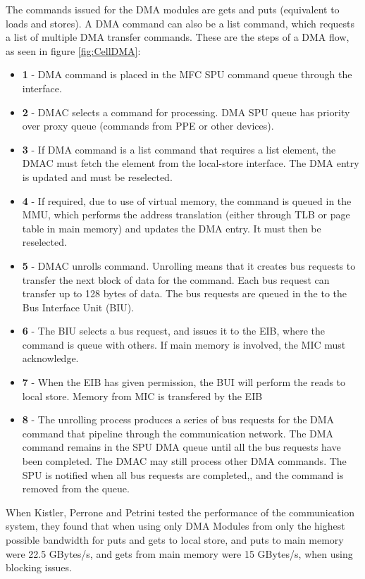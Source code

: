 The commands issued for the DMA modules are gets and puts (equivalent to loads and stores).
A DMA command can also be a list command, which requests a list of multiple DMA transfer commands.
These are the steps of a DMA flow, as seen in figure \ref{fig:CellDMA}:

\begin{itemize}
    \item \textbf{1} - DMA command is placed in the MFC SPU command queue through the interface.
    \item \textbf{2} - DMAC selects a command for processing. DMA SPU queue has priority over proxy queue (commands from PPE or other devices).
    \item \textbf{3} - If DMA command is a list command that requires a list element, the DMAC must fetch the element from the local-store interface. 
    The DMA entry is updated and must be reselected.
    \item \textbf{4} - If required, due to use of virtual memory, the command is queued in the MMU, which performs the address translation (either through TLB or page table in main memory) and updates the DMA entry. 
    It must then be reselected.
    \item \textbf{5} - DMAC unrolls command.
    Unrolling means that it creates bus requests to transfer the next block of data for the command.
    Each bus request can transfer up to 128 bytes of data.
    The bus requests are queued in the to the Bus Interface Unit (BIU).
    \item \textbf{6} - The BIU selects a bus request, and issues it to the EIB, where the command is queue with others.
    If main memory is involved, the MIC must acknowledge.
    \item \textbf{7} - When the EIB has given permission, the BUI will perform the reads to local store.
    Memory from MIC is transfered by the EIB
    \item \textbf{8} - The unrolling process produces a series of bus requests for the DMA command that pipeline through the communication network.
    The DMA command remains in the SPU DMA queue until all the bus requests have been completed.
    The DMAC may still process other DMA commands.
    The SPU is notified when all bus requests are completed,, and the command is removed from the queue. 
\end{itemize}


When Kistler, Perrone and Petrini tested the performance of the communication system, they found that when using only DMA Modules from only the highest possible bandwidth for puts and gets to local store, and puts to main memory were 22.5 GBytes/s, and gets from main memory were 15 GBytes/s, when using blocking issues.